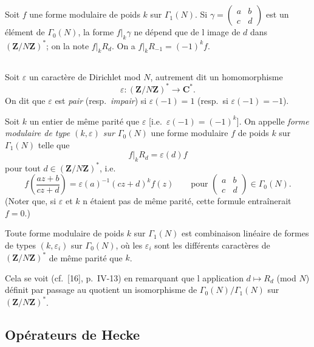 \documentclass[11pt]{amsart}
\theoremstyle{plain}
\theoremstyle{definition}
\theoremstyle{remark}
\newcommand{\Z}{\mathbf{Z}}
\newcommand{\C}{\mathbf{C}}
\begin{document}
\subsection{}

Soit $f$ une forme modulaire de poids $k$ sur $\Gamma_1(N)$. Si $\gamma = \begin{pmatrix} a & b \\ c & d \end{pmatrix}$ est un élément
de $\Gamma_0(N)$, la forme $f|_k \gamma$ ne dépend que de l image de $d$ dans $(\Z/N\Z)^*$; on la note $f|_k R_d$. On a $f|_k R_{-1} = (-1)^k f$.

\subsection{}

Soit $\varepsilon$ un caractère de Dirichlet mod $N$, autrement dit un homomorphisme
$$
\varepsilon : (\Z/N\Z)^* \longrightarrow \C^*.
$$
On dit que $\varepsilon$ est \emph{pair} (resp.~\emph{impair}) si $\varepsilon(-1) = 1$ (resp.~si $\varepsilon(-1) = -1$).

Soit $k$ un entier de même parité que $\varepsilon$ [i.e.~$\varepsilon(-1) = (-1)^k$]. On appelle \emph{forme modulaire de type $(k,\varepsilon)$ sur $\Gamma_0(N)$} une forme modulaire $f$ de poids $k$ sur $\Gamma_1(N)$ telle que
$$
f|_k R_d = \varepsilon(d) f
$$
pour tout $d \in (\Z/N\Z)^*$, i.e.
$$
f\left(\frac{az+b}{cz+d}\right) = \varepsilon(a)^{-1}(cz+d)^k f(z) \qquad \text{pour } \begin{pmatrix} a & b \\ c & d \end{pmatrix} \in \Gamma_0(N).
$$
(Noter que, si $\varepsilon$ et $k$ n étaient pas de même parité, cette formule entraînerait $f = 0$.)

Toute forme modulaire de poids $k$ sur $\Gamma_1(N)$ est combinaison linéaire de formes de types $(k, \varepsilon_i)$ sur $\Gamma_0(N)$, où les $\varepsilon_i$ sont les différents caractères de $(\Z/N\Z)^*$ de même parité que $k$.

Cela se voit (cf.~[16], p.~IV-13) en remarquant que l application $d \mapsto R_d$ (mod $N$) définit par passage au quotient un isomorphisme de $\Gamma_0(N)/\Gamma_1(N)$ sur $(\Z/N\Z)^*$.

\subsection{Opérateurs de Hecke}
\end{document}
